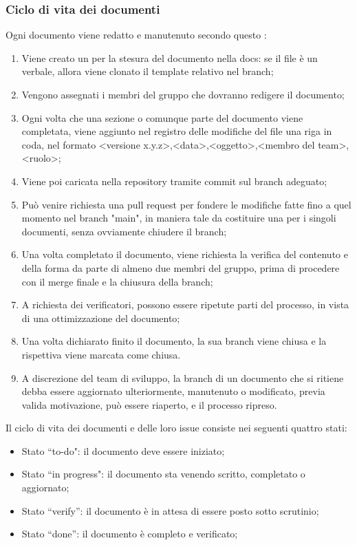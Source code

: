 \subsubsection{Ciclo di vita dei documenti}
Ogni documento viene redatto e manutenuto secondo questo :
\begin{enumerate}
    \item Viene creato un  per la stesura del documento nella  docs: se il file è un verbale, allora viene clonato il template relativo nel branch;
    \item Vengono assegnati i membri del gruppo che dovranno redigere il documento; 
    \item Ogni volta che una sezione o comunque parte del documento viene completata, viene aggiunto nel registro delle modifiche del file una riga in coda, nel formato <versione x.y.z>,<data>,<oggetto>,<membro del team>,<ruolo>;  
    \item Viene poi caricata nella repository tramite commit sul branch adeguato;
    \item Può venire richiesta una pull request per fondere le modifiche fatte fino a quel momento nel branch "main", in maniera tale da costituire una  per i singoli documenti, senza ovviamente chiudere il branch;
    \item Una volta completato il documento, viene richiesta la verifica del contenuto e della forma da parte di almeno due membri del gruppo, prima di procedere con il merge finale e la chiusura della branch; 
    \item A richiesta dei verificatori, possono essere ripetute parti del processo, in vista di una ottimizzazione del documento;
    \item Una volta dichiarato finito il documento, la sua branch viene chiusa e la rispettiva  viene marcata come chiusa.
    \item A discrezione del team di sviluppo, la branch di un documento che si ritiene debba essere aggiornato ulteriormente, manutenuto o modificato, previa valida motivazione, può essere riaperto, e il processo ripreso. 
\end{enumerate}
Il ciclo di vita dei documenti e delle loro issue consiste nei seguenti quattro stati:
\begin{itemize} 
    \item Stato ``to-do": il documento deve essere iniziato;
    \item Stato ``in progress": il documento sta venendo scritto, completato o aggiornato;
    \item Stato ``verify'': il documento è in attesa di essere posto sotto scrutinio;
    \item Stato ``done'': il documento è completo e verificato;
\end{itemize}
